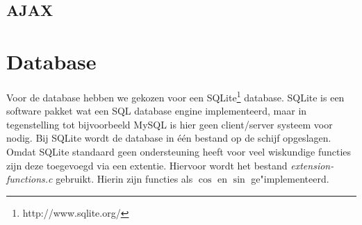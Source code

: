 \documentclass[twoside,openright]{uva-bachelor-thesis}
\begin{document}
		\subsection{AJAX}
	\section{Database}
		Voor de database hebben we gekozen voor een SQLite\footnote{http://www.sqlite.org/} database. SQLite is een software pakket wat een SQL database engine implementeerd, maar in tegenstelling tot bijvoorbeeld MySQL is hier geen client/server systeem voor nodig. Bij SQLite wordt de database in \'e\'en bestand op de schijf opgeslagen.
		\\[0.5cm]
		Omdat SQLite standaard geen ondersteuning heeft voor veel wiskundige functies zijn deze toegevoegd via een extentie. Hiervoor wordt het bestand \textit{extension-functions.c} gebruikt. Hierin zijn functies als $\cos$ en $\sin$ ge"implementeerd.
\end{document}

